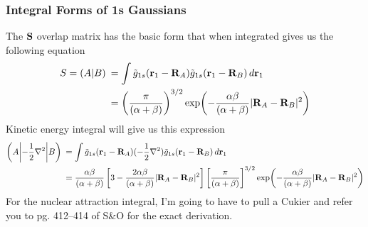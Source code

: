 \documentclass[11pt]{article}
\begin{document}
\subsubsection{Integral Forms of 1s Gaussians}
The $\textbf{S}$ overlap matrix has the basic form that when integrated gives us the following equation
\begin{align*}
S = \left(A\middle|B\right)\: &= \int \tilde{g}_{1s}(\textbf{r}_1 - \textbf{R}_A)\tilde{g}_{1s}(\textbf{r}_1 - \textbf{R}_B) \dd{\textbf{r}_1} \\
&= \qty(\frac{\pi}{(\alpha + \beta)})^{3/2} \exp(-\frac{\alpha\beta}{(\alpha + \beta)}|\textbf{R}_A - \textbf{R}_B|^2)
\end{align*}
Kinetic energy integral will give us this expression 
\begin{align*}
\cmel{A}{-\frac{1}{2}\laplacian }{B} &=\int \tilde{g}_{1s}(\bb{r}_1 - \bb{R}_A) (-\frac{1}{2}\laplacian) \tilde{g}_{1s}(\bb{r}_1 - \bb{R}_B) \dd{\bb{r}_1} \\
&= \frac{\alpha\beta}{(\alpha + \beta)} \left[ 3 - \frac{2\alpha\beta}{(\alpha + \beta)} | \bb{R}_A - \bb{R}_B|^2 \right]\left[\frac{\pi}{(\alpha + \beta)}\right]^{3/2} \exp(-\frac{\alpha\beta}{(\alpha + \beta)} |\bb{R}_A - \bb{R}_B|^2)
\end{align*}
For the nuclear attraction integral, I'm going to have to pull a Cukier and refer you to pg. 412--414 of S\&O for the exact derivation. 
\end{document}

